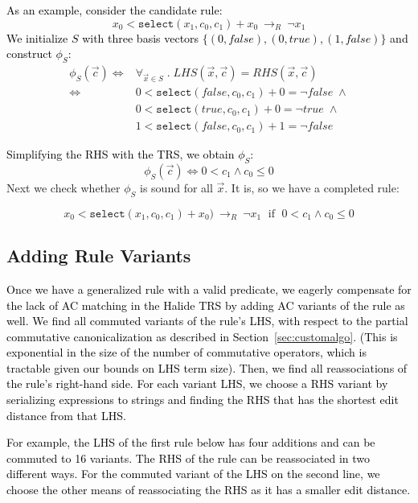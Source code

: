 \documentclass[acmsmall]{acmart}\settopmatter{}
\newcommand{\modified}[1]{\textcolor{black}{{#1}}}
\newcommand{\rewrites}[0]{\:\rightarrow_{R}\:}
\newcommand{\pred}[0]{\textrm{ if }}
\newcommand{\hsel}[0]{\texttt{select}}
\begin{document}
\modified{As an example, consider the candidate rule:}
%
\[ x_0 < \hsel(x_1, c_0, c_1) + x_0 \rewrites \neg x_1
\]
\modified{We initialize $S$ with three basis vectors $\{(0,\mathit{false}), (0,\mathit{true}), (1,\mathit{false})\}$ and construct $\phi_S$:}
%
\begin{equation*}
\begin{split}
 \phi_S(\vec{c}) \iff 
 &  \forall_{\vec{x} \in S} \;.\; LHS(\vec{x},\vec{c}) = RHS(\vec{x},\vec{c}) \\
 \iff & 
 0 < \hsel(\mathit{false}, c_0, c_1) + 0 = \neg\mathit{false} \; \wedge \\
                                                   & 0 < \hsel(\mathit{true}, c_0, c_1) + 0 = \neg \mathit{true}  \; \wedge \\
                                                   & 1 < \hsel(\mathit{false}, c_0, c_1) + 1 = \neg\mathit{false}
\end{split}
\end{equation*}

\modified{Simplifying the RHS with the TRS, we obtain $\phi_S$: }
%
\[  \phi_S(\vec{c}) \iff 0 < c_1 \wedge c_0 \le 0
\]
Next we check whether $\phi_S$ is sound for all $\vec{x}$.  It is, so we have a completed rule:

\[ x_0 < \hsel(x_1, c_0, c_1) + x_0) \rewrites \neg x_1 \;\pred \;0 < c_1 \wedge c_0 \le 0
\]


\subsection{Adding Rule Variants}
\label{sec:rulevariants}
\modified{Once we have a generalized rule with a valid predicate, we eagerly compensate for the lack
of AC matching in the Halide TRS by adding AC variants of the rule as well. We find 
all commuted variants of the rule's LHS,
with respect to the partial commutative canonicalization as described in Section~\ref{sec:customalgo}.
 (This is exponential in the size of the number 
of commutative operators, which is tractable given our bounds on LHS term size). 
Then, we find all reassociations of the rule's right-hand side. For each variant LHS, 
we choose a RHS variant by serializing expressions to strings and finding the RHS 
that has the shortest edit distance from that LHS. }

\modified{For example, the LHS of the first rule below has four additions and can be commuted 
to 16 variants. The RHS of the rule can be reassociated in two different ways. For the 
commuted variant of the LHS on the second line, we choose the other means of reassociating
the RHS as it has a smaller edit distance.}
\end{document}
